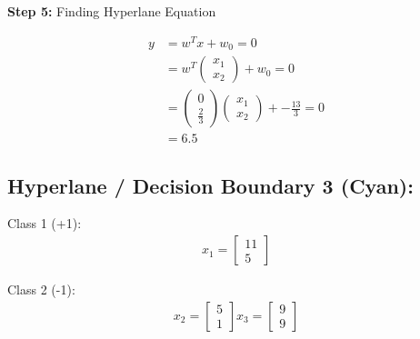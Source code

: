 \documentclass[12pt]{report}
\begin{document}
\vspace{20pt}
\textbf{Step 5:} Finding Hyperlane Equation

\begin{equation}
	\begin{aligned}
		y & = w^Tx + w_{0} = 0                                                                                            \\
		  & = w^T\begin{pmatrix}x_{1} \\x_{2}\end{pmatrix} + w_{0} = 0                                                    \\
		  & = \begin{pmatrix}0        \\ \frac{2}{3}\end{pmatrix}\begin{pmatrix}x_{1}\\x_{2}\end{pmatrix}+-\frac{13}{3}=0 \\
		  & = 6.5
	\end{aligned}
\end{equation}

\pagebreak
\subsection{Hyperlane / Decision Boundary 3 (Cyan):}

Class 1 (+1):
\begin{equation*}
	\begin{aligned}
		x_{1} = \begin{bmatrix}
			        11 \\
			        5
		        \end{bmatrix}
	\end{aligned}
\end{equation*}

Class 2 (-1):
\begin{equation*}
	\begin{aligned}
		x_{2} = \begin{bmatrix}
			        5 \\
			        1
		        \end{bmatrix}
		x_{3} = \begin{bmatrix}
			        9 \\
			        9
		        \end{bmatrix}
	\end{aligned}
\end{equation*}
\end{document}
